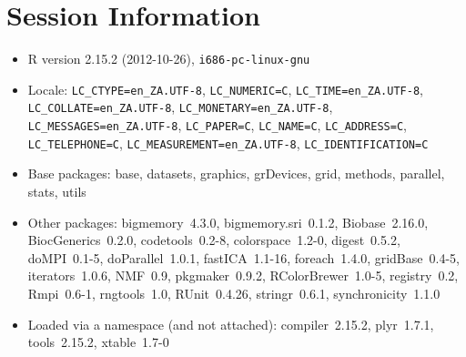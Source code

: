 \documentclass[10pt]{article}
\begin{document}
\section*{Session Information}
\begin{itemize}\raggedright
  \item R version 2.15.2 (2012-10-26), \verb|i686-pc-linux-gnu|
  \item Locale: \verb|LC_CTYPE=en_ZA.UTF-8|, \verb|LC_NUMERIC=C|, \verb|LC_TIME=en_ZA.UTF-8|, \verb|LC_COLLATE=en_ZA.UTF-8|, \verb|LC_MONETARY=en_ZA.UTF-8|, \verb|LC_MESSAGES=en_ZA.UTF-8|, \verb|LC_PAPER=C|, \verb|LC_NAME=C|, \verb|LC_ADDRESS=C|, \verb|LC_TELEPHONE=C|, \verb|LC_MEASUREMENT=en_ZA.UTF-8|, \verb|LC_IDENTIFICATION=C|
  \item Base packages: base, datasets, graphics, grDevices, grid,
    methods, parallel, stats, utils
  \item Other packages: bigmemory~4.3.0, bigmemory.sri~0.1.2,
    Biobase~2.16.0, BiocGenerics~0.2.0, codetools~0.2-8,
    colorspace~1.2-0, digest~0.5.2, doMPI~0.1-5, doParallel~1.0.1,
    fastICA~1.1-16, foreach~1.4.0, gridBase~0.4-5, iterators~1.0.6,
    NMF~0.9, pkgmaker~0.9.2, RColorBrewer~1.0-5, registry~0.2,
    Rmpi~0.6-1, rngtools~1.0, RUnit~0.4.26, stringr~0.6.1,
    synchronicity~1.1.0
  \item Loaded via a namespace (and not attached): compiler~2.15.2,
    plyr~1.7.1, tools~2.15.2, xtable~1.7-0
\end{itemize}
\end{document}
